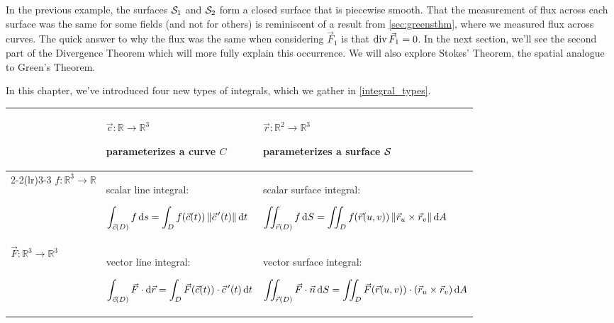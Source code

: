 In the previous example, the surfaces $\mathcal{S}_1$ and $\mathcal{S}_2$ form a closed surface that is piecewise smooth. That the measurement of flux across each surface was the same for some fields (and not for others) is reminiscent of a result from \autoref{sec:greensthm}, where we measured flux across curves. The quick answer to why the flux was the same when considering $\vec F_1$ is that $\operatorname{div} \vec F_1 = 0$. In the next section, we'll see the second part of the Divergence Theorem which will more fully explain this occurrence. We will also explore Stokes' Theorem, the spatial analogue to Green's Theorem.\bigskip

In this chapter, we've introduced four new types of integrals, which we gather in \autoref{integral_types}.

{
\begin{keyidea}\label{integral_types}%
\renewcommand{\arraystretch}{2}
\setlength{\tabcolsep}{1.5em}
 \begin{tabular}{ l p{13em} p{17em} }\toprule
  & $\vec c:\mathbb{R}\to\mathbb{R}^3$\par parameterizes a curve $C$
  & $\vec r:\mathbb{R}^2\to\mathbb{R}^3$\par parameterizes a surface $\mathcal{S}$ \\\cmidrule(lr){2-2}\cmidrule(lr){3-3}
  $f:\mathbb{R}^3\to\mathbb{R}$
  & scalar line integral:\par
  $\displaystyle\int_{\vec c(D)} f\operatorname{d}\! s=\int_D f(\vec c(t))\left\lVert \vec c\,'(t) \right\rVert\operatorname{d}\! t$
  & scalar surface integral:\par
  $\displaystyle\iint_{\vec r(D)} f\operatorname{d}\! S=\iint_D f(\vec r(u,v))\left\lVert \vec r_u\times\vec r_v \right\rVert\operatorname{d}\! A$
  \\
  $\vec F:\mathbb{R}^3\to\mathbb{R}^3$
  & vector line integral:\par
  $\displaystyle\int_{\vec c(D)}\vec F\cdot\operatorname{d}\!\vec r=\int_D\vec F(\vec c(t))\cdot\vec c\,'(t)\operatorname{d}\! t$
  & vector surface integral:\par
  $\displaystyle\iint_{\vec r(D)}\vec F\cdot\vec n\operatorname{d}\! S
  =\iint_D\vec F(\vec r(u,v))\cdot(\vec r_u\times\vec r_v)\operatorname{d}\! A$
 \end{tabular}
\end{keyidea}
}


